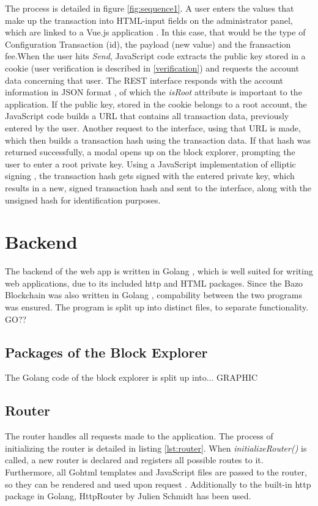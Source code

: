 The process is detailed in figure \ref{fig:sequence1}. A user enters the values that make up the transaction into HTML-input fields on the administrator panel, which are linked to a Vue.js application \cite{vue} . In this case, that would be the type of Configuration Transaction (id), the payload (new value) and the fransaction fee.When the user hits \emph{Send}, JavaScript code extracts the public key stored in a cookie \cite{cookies} (user verification is described in \ref{verification}) and requests the account data concerning that user. The REST interface responds with the account information in JSON format \cite{json} , of which the \emph{isRoot} attribute is important to the application. If the public key, stored in the cookie belongs to a root account, the JavaScript code builds a URL that contains all transaction data, previously entered by the user. Another request to the interface, using that URL is made, which then builds a transaction hash using the transaction data. If that hash was returned successfully, a modal opens up on the block explorer, prompting the user to enter a root private key. Using a JavaScript implementation of elliptic signing \cite{elliptic}, the transaction hash gets signed with the entered private key, which results in a new, signed transaction hash and sent to the interface, along with the unsigned hash for identification purposes.


\section{Backend}
The backend of the web app is written in Golang \cite{golang}, which is well suited for writing web applications, due to its included http \cite{httppackage}and HTML \cite{template} packages. Since the Bazo Blockchain was also written in Golang \cite{bazo}, compability between the two programs was ensured. The program is split up into distinct files, to separate functionality. GO??
\subsection{Packages of the Block Explorer}
The Golang code of the block explorer is split up into...
GRAPHIC
\subsection{Router}
The router handles all requests made to the application. The process of initializing the router is detailed in listing \ref{lst:router}. When \emph{initializeRouter()} is called, a new router is declared and registers all possible routes to it. Furthermore, all Gohtml templates and JavaScript files are passed to the router, so they can be rendered and used upon request \cite{httppackage}. 
Additionally to the built-in http package in Golang, HttpRouter by Julien Schmidt \cite{httprouter} has been used. 


